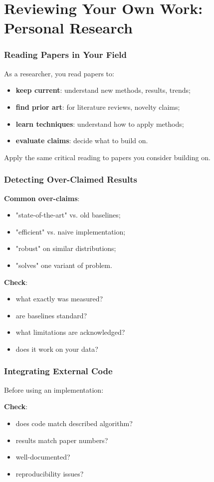 \documentclass[]{beamer}
\begin{document}
\section{Reviewing Your Own Work: Personal Research}

\begin{frame}[fragile]
\frametitle{Reading Papers in Your Field}
As a researcher, you read papers to:
\begin{itemize}
  \item \textbf{keep current}: understand new methods, results, trends;
  \item \textbf{find prior art}: for literature reviews, novelty claims;
  \item \textbf{learn techniques}: understand how to apply methods;
  \item \textbf{evaluate claims}: decide what to build on.
\end{itemize}

Apply the same critical reading to papers you consider building on.

\end{frame}

\begin{frame}[fragile]
\frametitle{Detecting Over-Claimed Results}
\textbf{Common over-claims}:
\begin{itemize}
  \item "state-of-the-art" vs. old baselines;
  \item "efficient" vs. naive implementation;
  \item "robust" on similar distributions;
  \item "solves" one variant of problem.
\end{itemize}

\textbf{Check}:
\begin{itemize}
  \item what exactly was measured?
  \item are baselines standard?
  \item what limitations are acknowledged?
  \item does it work on your data?
\end{itemize}

\end{frame}

\begin{frame}[fragile]
\frametitle{Integrating External Code}
Before using an implementation:

\textbf{Check}:
\begin{itemize}
  \item does code match described algorithm?
  \item results match paper numbers?
  \item well-documented?
  \item reproducibility issues?
\end{itemize}

\end{frame}
\end{document}

